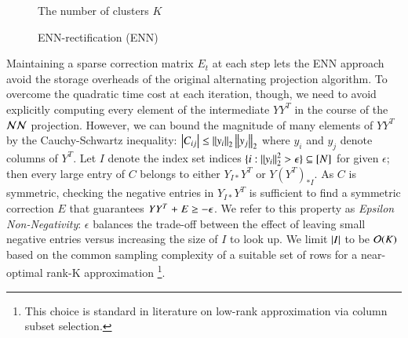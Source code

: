 \begin{figure}[hbpt]
	\begin{algorithm}[H]
		\DontPrintSemicolon
		\hspace{28px} The number of clusters $K$\\
		\caption{ENN-rectification (ENN)}
	\label{alg:enn}        
	\end{algorithm}
\end{figure}

Maintaining a sparse correction matrix $E_t$ at each step lets the ENN approach
avoid the storage overheads of the original alternating projection algorithm. 
To overcome the quadratic time cost at each iteration, though, we need to avoid
explicitly computing every element of the intermediate $Y Y^T$ in the course of
the $\mathcal{NN}$ projection. However, we can bound the magnitude of many elements of
$YY^T$ by the Cauchy\hyp{}Schwartz inequality: $\left\lvert C_{ij}\right\rvert \leq \left\lVert y_i\right\rVert_2 
\left\lVert y_j\right\rVert_2$ where $y_i$ and $y_j$ denote columns of $Y^T$. Let $I$ denote the
index set indices $\{i :\left\lVert y_i\right\rVert^2_2 > \epsilon\} \subseteq [N]$ for given
$\epsilon$; then every large entry of $C$ belongs to either $Y_{I*}Y^T$ or $Y
(Y^T)_{*I}$. As $C$ is symmetric, checking the negative entries in $Y_{I*}Y^T$
is sufficient to find a symmetric correction $E$ that guarantees $YY^T \mathrel{+} E
\geq -\epsilon$. We refer to this property as \textit{Epsilon
Non\hyp{}Negativity}: $\epsilon$ balances the trade\hyp{}off between the effect
of leaving small negative entries versus increasing the size of $I$ to look up.
We limit $\left\lvert I\right\rvert$ to be $\mathcal{O}(K)$ based on the common sampling complexity of a
suitable set of rows for a near\hyp{}optimal rank\hyp{}K approximation
\footnote{This choice is standard in literature on low\hyp{}rank approximation
via column subset selection.}.

